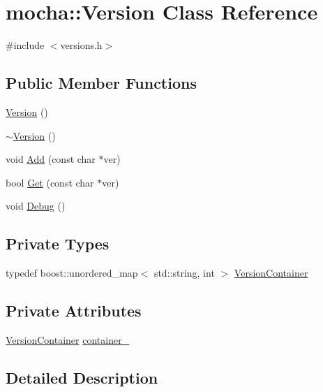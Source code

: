 \hypertarget{classmocha_1_1_version}{
\section{mocha::Version Class Reference}
\label{classmocha_1_1_version}
}


{\ttfamily \#include $<$versions.h$>$}

\subsection*{Public Member Functions}
\begin{DoxyCompactItemize}
\item 
\hyperlink{classmocha_1_1_version_a16d996f8e5170b64f1a469e7a906143e}{Version} ()
\item 
\hyperlink{classmocha_1_1_version_ad1dc40d90d1fe487e0affc3885553ecb}{$\sim$Version} ()
\item 
void \hyperlink{classmocha_1_1_version_a9bc5b5368907ff25aaea347e66cb22ec}{Add} (const char $\ast$ver)
\item 
bool \hyperlink{classmocha_1_1_version_a97ed1c0993f954c1c168c826fcc8770a}{Get} (const char $\ast$ver)
\item 
void \hyperlink{classmocha_1_1_version_a4592f646306e74b5aa03e1a296d953c4}{Debug} ()
\end{DoxyCompactItemize}
\subsection*{Private Types}
\begin{DoxyCompactItemize}
\item 
typedef boost::unordered\_\-map$<$ std::string, int $>$ \hyperlink{classmocha_1_1_version_a9e8980ead3435465823ac253bf1e3385}{VersionContainer}
\end{DoxyCompactItemize}
\subsection*{Private Attributes}
\begin{DoxyCompactItemize}
\item 
\hyperlink{classmocha_1_1_version_a9e8980ead3435465823ac253bf1e3385}{VersionContainer} \hyperlink{classmocha_1_1_version_a7b1ea5b68dd5f6296d22a7c40ec3bac3}{container\_\-}
\end{DoxyCompactItemize}


\subsection{Detailed Description}


